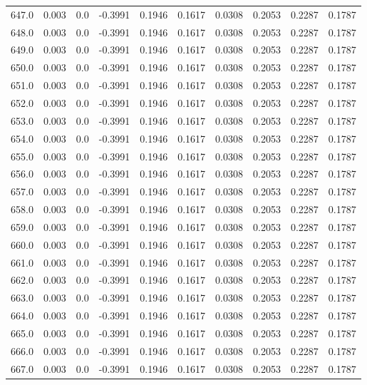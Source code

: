 \begin{longtable}{lrrrrrrrrr}
647.0 & 0.003 & 0.0 & -0.3991 & 0.1946 & 0.1617 & 0.0308 & 0.2053 & 0.2287 & 0.1787 \\
648.0 & 0.003 & 0.0 & -0.3991 & 0.1946 & 0.1617 & 0.0308 & 0.2053 & 0.2287 & 0.1787 \\
649.0 & 0.003 & 0.0 & -0.3991 & 0.1946 & 0.1617 & 0.0308 & 0.2053 & 0.2287 & 0.1787 \\
650.0 & 0.003 & 0.0 & -0.3991 & 0.1946 & 0.1617 & 0.0308 & 0.2053 & 0.2287 & 0.1787 \\
651.0 & 0.003 & 0.0 & -0.3991 & 0.1946 & 0.1617 & 0.0308 & 0.2053 & 0.2287 & 0.1787 \\
652.0 & 0.003 & 0.0 & -0.3991 & 0.1946 & 0.1617 & 0.0308 & 0.2053 & 0.2287 & 0.1787 \\
653.0 & 0.003 & 0.0 & -0.3991 & 0.1946 & 0.1617 & 0.0308 & 0.2053 & 0.2287 & 0.1787 \\
654.0 & 0.003 & 0.0 & -0.3991 & 0.1946 & 0.1617 & 0.0308 & 0.2053 & 0.2287 & 0.1787 \\
655.0 & 0.003 & 0.0 & -0.3991 & 0.1946 & 0.1617 & 0.0308 & 0.2053 & 0.2287 & 0.1787 \\
656.0 & 0.003 & 0.0 & -0.3991 & 0.1946 & 0.1617 & 0.0308 & 0.2053 & 0.2287 & 0.1787 \\
657.0 & 0.003 & 0.0 & -0.3991 & 0.1946 & 0.1617 & 0.0308 & 0.2053 & 0.2287 & 0.1787 \\
658.0 & 0.003 & 0.0 & -0.3991 & 0.1946 & 0.1617 & 0.0308 & 0.2053 & 0.2287 & 0.1787 \\
659.0 & 0.003 & 0.0 & -0.3991 & 0.1946 & 0.1617 & 0.0308 & 0.2053 & 0.2287 & 0.1787 \\
660.0 & 0.003 & 0.0 & -0.3991 & 0.1946 & 0.1617 & 0.0308 & 0.2053 & 0.2287 & 0.1787 \\
661.0 & 0.003 & 0.0 & -0.3991 & 0.1946 & 0.1617 & 0.0308 & 0.2053 & 0.2287 & 0.1787 \\
662.0 & 0.003 & 0.0 & -0.3991 & 0.1946 & 0.1617 & 0.0308 & 0.2053 & 0.2287 & 0.1787 \\
663.0 & 0.003 & 0.0 & -0.3991 & 0.1946 & 0.1617 & 0.0308 & 0.2053 & 0.2287 & 0.1787 \\
664.0 & 0.003 & 0.0 & -0.3991 & 0.1946 & 0.1617 & 0.0308 & 0.2053 & 0.2287 & 0.1787 \\
665.0 & 0.003 & 0.0 & -0.3991 & 0.1946 & 0.1617 & 0.0308 & 0.2053 & 0.2287 & 0.1787 \\
666.0 & 0.003 & 0.0 & -0.3991 & 0.1946 & 0.1617 & 0.0308 & 0.2053 & 0.2287 & 0.1787 \\
667.0 & 0.003 & 0.0 & -0.3991 & 0.1946 & 0.1617 & 0.0308 & 0.2053 & 0.2287 & 0.1787 \\

\end{longtable}
